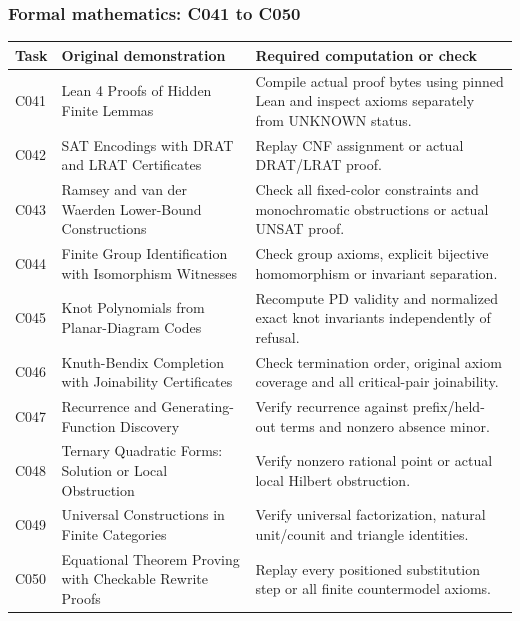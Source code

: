\documentclass[
  11pt,
]{article}
\begin{document}
\subsubsection{Formal mathematics: C041 to
C050}\label{formal-mathematics-c041-to-c050}

\begin{longtable}[]{@{}
  >{\raggedright\arraybackslash}p{}
  >{\raggedright\arraybackslash}p{}
  >{\raggedright\arraybackslash}p{}@{}}
\toprule\noalign{}
\begin{minipage}[b]{\linewidth}\raggedright
Task
\end{minipage} & \begin{minipage}[b]{\linewidth}\raggedright
Original demonstration
\end{minipage} & \begin{minipage}[b]{\linewidth}\raggedright
Required computation or check
\end{minipage} \\
\midrule\noalign{}
\endhead
\bottomrule\noalign{}
\endlastfoot
C041 & Lean 4 Proofs of Hidden Finite Lemmas & Compile actual proof
bytes using pinned Lean and inspect axioms separately from UNKNOWN
status. \\
C042 & SAT Encodings with DRAT and LRAT Certificates & Replay CNF
assignment or actual DRAT/LRAT proof. \\
C043 & Ramsey and van der Waerden Lower-Bound Constructions & Check all
fixed-color constraints and monochromatic obstructions or actual UNSAT
proof. \\
C044 & Finite Group Identification with Isomorphism Witnesses & Check
group axioms, explicit bijective homomorphism or invariant
separation. \\
C045 & Knot Polynomials from Planar-Diagram Codes & Recompute PD
validity and normalized exact knot invariants independently of
refusal. \\
C046 & Knuth-Bendix Completion with Joinability Certificates & Check
termination order, original axiom coverage and all critical-pair
joinability. \\
C047 & Recurrence and Generating-Function Discovery & Verify recurrence
against prefix/held-out terms and nonzero absence minor. \\
C048 & Ternary Quadratic Forms: Solution or Local Obstruction & Verify
nonzero rational point or actual local Hilbert obstruction. \\
C049 & Universal Constructions in Finite Categories & Verify universal
factorization, natural unit/counit and triangle identities. \\
C050 & Equational Theorem Proving with Checkable Rewrite Proofs & Replay
every positioned substitution step or all finite countermodel axioms. \\
\end{longtable}
\end{document}
